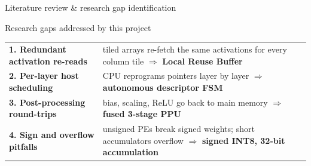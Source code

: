 \documentclass[aspectratio=169,10pt,t]{beamer}
\begin{document}
\begin{frame}{Literature review \& research gap identification}
  \vspace{4pt}
  \begin{block}{Research gaps addressed by this project}
    \scriptsize
    \renewcommand{\arraystretch}{1.25}
    \begin{tabularx}{\textwidth}{@{}p{3.9cm}>{\raggedright\arraybackslash}X@{}}
      \textbf{1. Redundant activation re-reads} & tiled arrays re-fetch the same activations for every column tile $\Rightarrow$ \textbf{Local Reuse Buffer}\\
      \textbf{2. Per-layer host scheduling} & CPU reprograms pointers layer by layer $\Rightarrow$ \textbf{autonomous descriptor FSM}\\
      \textbf{3. Post-processing round-trips} & bias, scaling, ReLU go back to main memory $\Rightarrow$ \textbf{fused 3-stage PPU}\\
      \textbf{4. Sign and overflow pitfalls} & unsigned PEs break signed weights; short accumulators overflow $\Rightarrow$ \textbf{signed INT8, 32-bit accumulation}\\
    \end{tabularx}
  \end{block}
\end{frame}
\end{document}

